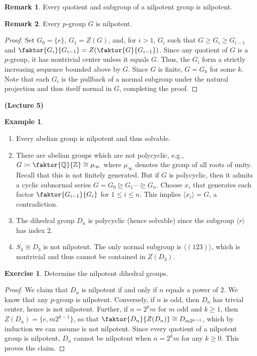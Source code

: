 \documentclass[10pt,letterpaper,cm]{nupset}
\theoremstyle{definition}
\newtheorem{exmp}{Example}
\newtheorem{remark}{Remark}
\newtheorem{exercise}{Exercise}
\newcommand{\Q}{\mathbb Q}
\newcommand{\Z}{\mathbb Z}
\newcommand{\1}{\mathbf{1}}
\newcommand{\0}{\vec 0}
\begin{document}
\begin{remark}
Every quotient and subgroup of a nilpotent group is nilpotent. 
\end{remark}

\begin{remark}
Every $p$-group $G$ is nilpotent. 
\end{remark}
\begin{proof}
Set $G_0 = \{e\}$, $G_1 = Z(G)$, and, for $i>1$, $G_{i}$ such that $G \geq G_i \geq G_{i-1}$ and $\faktor{G_i}{G_{i-1}} = Z(\faktor{G}{G_{i-1}})$. Since any quotient of $G$ is a $p$-group, it has nontrivial center unless it equals $G$.  Thus, the $G_i$ form a strictly increasing sequence bounded above by $G$. Since $G$ is finite, $G = G_k$ for some $k$. Note that each $G_i$ is the pullback of a normal subgroup under the natural projection and thus itself normal in $G$, completing the proof.
\end{proof}

\begin{center}
{\textbf{(Lecture 5)}}
\end{center}

\begin{exmp}  $ $
\begin{enumerate}
\item Every abelian group is nilpotent and thus solvable. 
\item There are abelian groups which are not polycyclic, e.g., $G\coloneqq \faktor{\Q}{\Z} \cong \mu_{\infty}$ where $\mu_{\infty}$ denotes the group of all roots of unity. Recall that this is  not finitely generated.  But if $G$ is polycyclic, then it admits a cyclic subnormal series $G = G_0 \unrhd G_1 \cdots \unrhd G_n$. Choose $x_i$ that generates each factor $\faktor{G_{i-1}}{G_i}$ for $1\leq i \leq n$.  This implies $\langle x_i\rangle = G$, a contradiction. 
\item The dihedral group $D_n$ is polycyclic (hence solvable) since the subgroup $\langle r\rangle$ has index $2$.
\item $S_3\cong D_3$ is not nilpotent. The only normal subgroup is $\langle (1 2 3)\rangle$, which is nontrivial and thus cannot be contained in $Z(D_3)$.
\end{enumerate}
\end{exmp}

\begin{exercise}
Determine the nilpotent dihedral groups. 
\end{exercise}
\begin{proof}
We claim that $D_n$ is nilpotent  if and only if $n$ equals a power of $2$. We know that any $p$-group is nilpotent. Conversely, if $n$ is odd, then $D_n$ has trivial center, hence is not nilpotent. Further, if $n= 2^km$ for $m$ odd and $k\geq 1$, then $Z(D_n) = \{e, m2^{k-1}\}$, so that $\faktor{D_n}{Z(D_n)} \cong D_{m2^{k-1}}$, which by induction we can assume is not nilpotent. Since every quotient of a nilpotent group is nilpotent, $D_n$ cannot be nilpotent when $n = 2^km$ for any $k\geq 0$. This proves the claim.
\end{proof}
\end{document}
